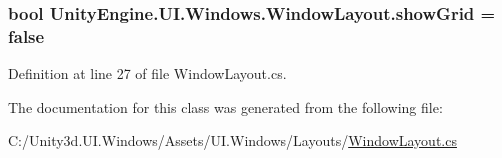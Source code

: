 \subsubsection[{show\+Grid}]{\setlength{\rightskip}{0pt plus 5cm}bool Unity\+Engine.\+U\+I.\+Windows.\+Window\+Layout.\+show\+Grid = false}\label{class_unity_engine_1_1_u_i_1_1_windows_1_1_window_layout_a33e8f916ed337b6106080059b2ff3329}


Definition at line 27 of file Window\+Layout.\+cs.



The documentation for this class was generated from the following file\+:\begin{DoxyCompactItemize}
\item 
C\+:/\+Unity3d.\+U\+I.\+Windows/\+Assets/\+U\+I.\+Windows/\+Layouts/\hyperlink{_window_layout_8cs}{Window\+Layout.\+cs}\end{DoxyCompactItemize}
